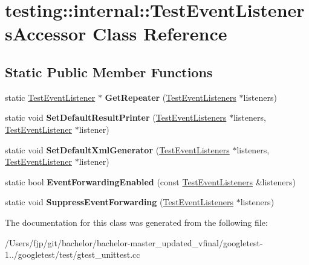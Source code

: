\hypertarget{classtesting_1_1internal_1_1_test_event_listeners_accessor}{}\section{testing\+:\+:internal\+:\+:Test\+Event\+Listeners\+Accessor Class Reference}
\label{classtesting_1_1internal_1_1_test_event_listeners_accessor}
\subsection*{Static Public Member Functions}
\begin{DoxyCompactItemize}
\item 
\mbox{\label{classtesting_1_1internal_1_1_test_event_listeners_accessor_a07c6f8644e509d0f23c0c16a60856387}} 
static \mbox{\hyperlink{classtesting_1_1_test_event_listener}{Test\+Event\+Listener}} $\ast$ {\bfseries Get\+Repeater} (\mbox{\hyperlink{classtesting_1_1_test_event_listeners}{Test\+Event\+Listeners}} $\ast$listeners)
\item 
\mbox{\label{classtesting_1_1internal_1_1_test_event_listeners_accessor_ac8886c7cea5a4ad39aed276d3f58da75}} 
static void {\bfseries Set\+Default\+Result\+Printer} (\mbox{\hyperlink{classtesting_1_1_test_event_listeners}{Test\+Event\+Listeners}} $\ast$listeners, \mbox{\hyperlink{classtesting_1_1_test_event_listener}{Test\+Event\+Listener}} $\ast$listener)
\item 
\mbox{\label{classtesting_1_1internal_1_1_test_event_listeners_accessor_a8c04463b5ba5ee6d6da36e2171c7fff0}} 
static void {\bfseries Set\+Default\+Xml\+Generator} (\mbox{\hyperlink{classtesting_1_1_test_event_listeners}{Test\+Event\+Listeners}} $\ast$listeners, \mbox{\hyperlink{classtesting_1_1_test_event_listener}{Test\+Event\+Listener}} $\ast$listener)
\item 
\mbox{\label{classtesting_1_1internal_1_1_test_event_listeners_accessor_a4a7522557045cb55eb037dc61429d71c}} 
static bool {\bfseries Event\+Forwarding\+Enabled} (const \mbox{\hyperlink{classtesting_1_1_test_event_listeners}{Test\+Event\+Listeners}} \&listeners)
\item 
\mbox{\label{classtesting_1_1internal_1_1_test_event_listeners_accessor_abfc0a0f8163465f4f5d42436ec8c7cb3}} 
static void {\bfseries Suppress\+Event\+Forwarding} (\mbox{\hyperlink{classtesting_1_1_test_event_listeners}{Test\+Event\+Listeners}} $\ast$listeners)
\end{DoxyCompactItemize}


The documentation for this class was generated from the following file\+:\begin{DoxyCompactItemize}
\item 
/\+Users/fjp/git/bachelor/bachelor-\/master\+\_\+updated\+\_\+vfinal/googletest-\/1../googletest/test/gtest\+\_\+unittest.\+cc\end{DoxyCompactItemize}
